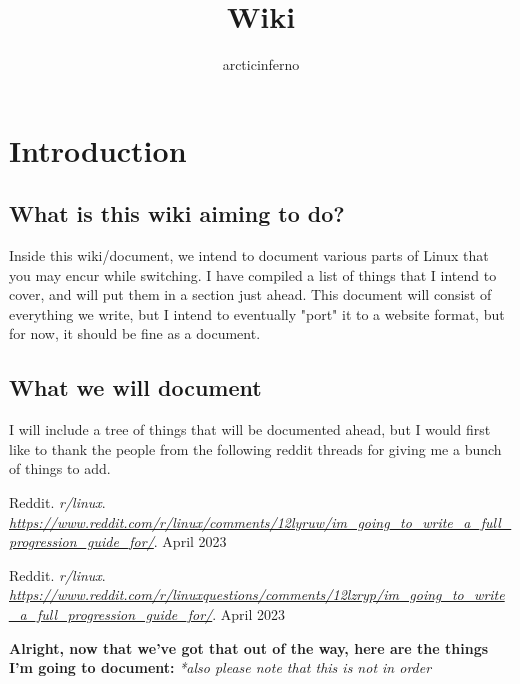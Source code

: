 \documentclass {report}
\title{Wiki}
\author{arcticinferno}
\newcommand{\link}[4]{
  #1. \textit{#2}. \textit{\url{#4}}. #3 \newline
}
\begin{document}
\maketitle

\tableofcontents


\chapter{Introduction}

\section{What is this wiki aiming to do?}
Inside this wiki/document, we intend to document various parts of Linux that you may encur while switching. I have compiled a list of things that I intend to cover, and will put them in a section just ahead. This document will consist of everything we write, but I intend to eventually "port" it to a website format, but for now, it should be fine as a document.

\section{What we will document}

I will include a tree of things that will be documented ahead, but I would first like to thank the people from the following reddit threads for giving me a bunch of things to add.


\link{Reddit}{r/linux}{April 2023}{https://www.reddit.com/r/linux/comments/12lyruw/im\_going\_to\_write\_a\_full\_progression\_guide\_for/}

\link{Reddit}{r/linux}{April 2023}{https://www.reddit.com/r/linuxquestions/comments/12lzryp/im\_going\_to\_write\_a\_full\_progression\_guide\_for/}


\textbf{Alright, now that we've got that out of the way, here are the things I'm going to document:}
\textit{*also please note that this is not in order}
\end{document}
